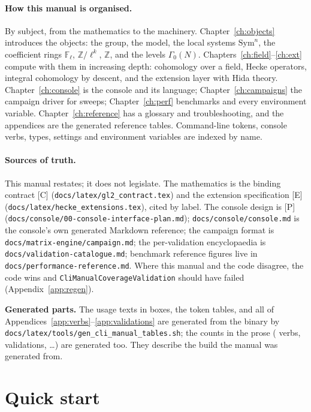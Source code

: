 \documentclass[11pt,openany]{report}
\newcommand{\Z}{\mathbb{Z}}
\newcommand{\Fl}{\mathbb{F}_{\ell}}
\newcommand{\Sym}{\mathrm{Sym}}
\newcommand{\file}[1]{\nolinkurl{#1}}
\newcommand{\vb}[1]{\texttt{#1}}
\begin{document}
\paragraph{How this manual is organised.}
By subject, from the mathematics to the machinery. Chapter~\ref{ch:objects} introduces the objects: the group, the
model, the local systems $\Sym^n$, the coefficient rings $\Fl$, $\Z/\ell^k$, $\Z$, and the levels $\Gamma_0(N)$.
Chapters~\ref{ch:field}--\ref{ch:ext} compute with them in increasing depth: cohomology over a field, Hecke operators,
integral cohomology by descent, and the extension layer with Hida theory. Chapter~\ref{ch:console} is the console and its
language; Chapter~\ref{ch:campaigns} the campaign driver for sweeps; Chapter~\ref{ch:perf} benchmarks and every
environment variable. Chapter~\ref{ch:reference} has a glossary and troubleshooting, and the appendices are the generated
reference tables. Command-line tokens, console verbs, types, settings and environment variables are indexed by name.

\paragraph{Sources of truth.}
This manual restates; it does not legislate. The mathematics is the binding contract [C]
(\file{docs/latex/gl2_contract.tex}) and the extension specification [E]
(\file{docs/latex/hecke_extensions.tex}), cited by label. The console design is [P]
(\file{docs/console/00-console-interface-plan.md}); \file{docs/console/console.md} is the console's own
generated Markdown reference; the campaign format is \file{docs/matrix-engine/campaign.md}; the
per-validation encyclopaedia is \file{docs/validation-catalogue.md}; benchmark reference figures live
in \file{docs/performance-reference.md}. Where this manual and the code disagree, the code wins and
\vb{CliManualCoverageValidation} should have failed (Appendix~\ref{app:regen}).

\begin{note}
\textbf{Generated parts.} The usage texts in boxes, the token tables, and all of Appendices~\ref{app:verbs}--\ref{app:validations} are generated from the binary
by \file{docs/latex/tools/gen_cli_manual_tables.sh}; the counts in the prose
(\CMNumVerbs{} verbs, \CMNumValidations{} validations, \dots) are generated too. They describe the build
the manual was generated from.
\end{note}

\section{Quick start}\label{sec:quickstart}
\end{document}
